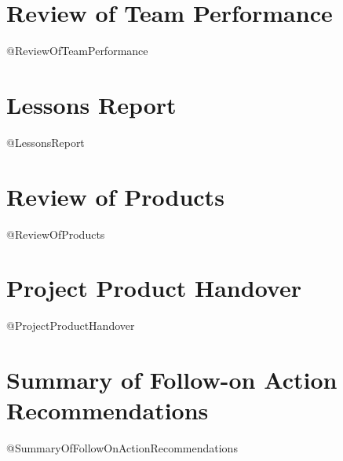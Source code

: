 \documentclass{report}
\begin{document}
\section{Review of Team Performance}
@ReviewOfTeamPerformance

\section{Lessons Report}
@LessonsReport

\section{Review of Products}
@ReviewOfProducts

\section{Project Product Handover}
@ProjectProductHandover

\section{Summary of Follow-on Action Recommendations}
@SummaryOfFollowOnActionRecommendations
\end{document}
